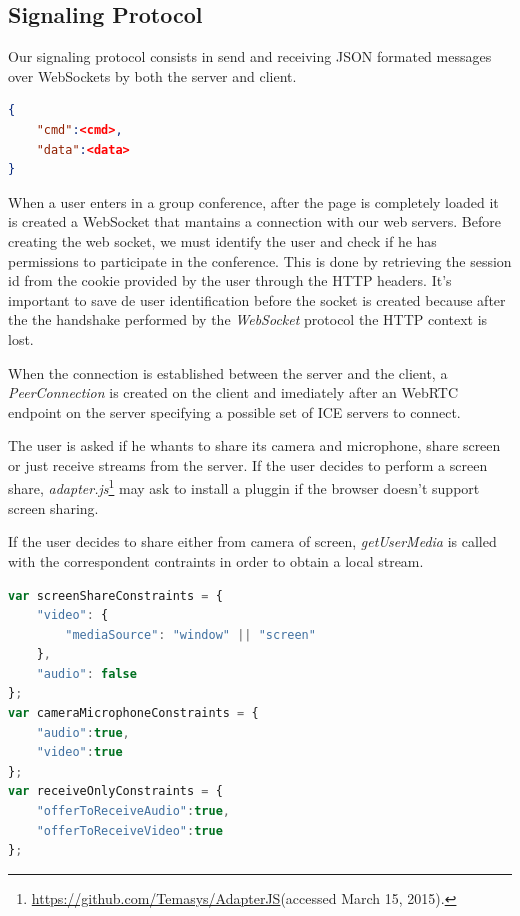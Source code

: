 \subsection{Signaling Protocol}

Our signaling protocol consists in send and receiving JSON formated messages over WebSockets by both the server and client. 

\begin{lstlisting}[caption={General structure of our WebSocket messages},language=json]
{
	"cmd":<cmd>,
	"data":<data>
}
\end{lstlisting}

When a user enters in a group conference, after the page is completely loaded it is created a WebSocket that mantains a connection with our web servers. 
Before creating the web socket, we must identify the user and check if he has permissions to participate in the conference. This is done by retrieving the session id from the cookie provided by the user through the \ac{HTTP} headers. It's important to save de user identification before the socket is created because after the the handshake performed by the \emph{WebSocket} protocol\cite{rfc6455} the \ac{HTTP} context is lost.

When the connection is established between the server and the client, a \emph{PeerConnection} is created on the client and imediately after an \ac{WebRTC} endpoint on the server specifying a possible set of \ac{ICE} servers to connect.

The user is asked if he whants to share its camera and microphone, share screen or just receive streams from the server. If the user decides to perform a screen share, \emph{adapter.js}\footnote{\url{https://github.com/Temasys/AdapterJS}(accessed March 15, 2015).} may ask to install a pluggin if the browser doesn't support screen sharing.

If the user decides to share either from camera of screen, \emph{getUserMedia} is called with the correspondent contraints in order to obtain a local stream. 

\begin{lstlisting}[caption={Media constraints},language=JavaScript]
var screenShareConstraints = {	
	"video": {
		"mediaSource": "window" || "screen"
	}, 
	"audio": false
};
var cameraMicrophoneConstraints = {
	"audio":true, 
	"video":true 
};
var receiveOnlyConstraints = {
	"offerToReceiveAudio":true,
	"offerToReceiveVideo":true
};
\end{lstlisting}

